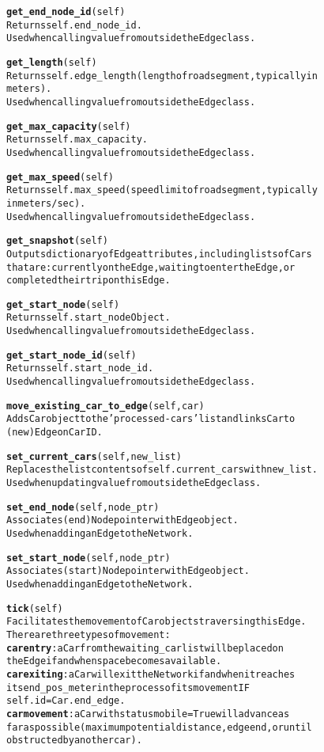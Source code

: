 \begin{alltt}
\textbf{get_end_node_id}(self)
Returns self.end_node_id.
Used when calling value from outside the Edge class.

\textbf{get_length}(self)
Returns self.edge_length (length of road segment, typically in 
meters).
Used when calling value from outside the Edge class.

\textbf{get_max_capacity}(self)
Returns self.max_capacity.
Used when calling value from outside the Edge class.

\textbf{get_max_speed}(self)
Returns self.max_speed (speed limit of road segment, typically
in meters/sec).
Used when calling value from outside the Edge class.

\textbf{get_snapshot}(self)
Outputs dictionary of Edge attributes, including lists of Cars 
that are:  currently on the Edge, waiting to enter the Edge, or 
completed their trip on this Edge.

\textbf{get_start_node}(self)
Returns self.start_node Object.
Used when calling value from outside the Edge class.

\textbf{get_start_node_id}(self)
Returns self.start_node_id.
Used when calling value from outside the Edge class.

\textbf{move_existing_car_to_edge}(self, car)
Adds Car object to the 'processed-cars' list and links Car to 
(new) Edge on Car ID.

\textbf{set_current_cars}(self, new_list)
Replaces the list contents of self.current_cars with new_list.
Used when updating value from outside the Edge class.

\textbf{set_end_node}(self, node_ptr)
Associates (end) Node pointer with Edge object.
Used when adding an Edge to the Network.

\textbf{set_start_node}(self, node_ptr)
Associates (start) Node pointer with Edge object.
Used when adding an Edge to the Network.

\textbf{tick}(self)
Facilitates the movement of Car objects traversing this Edge.  
There are three types of movement:
\textbf{car entry}:  a Car from the waiting_car list will be placed on 
the Edge if and when space becomes available.
\textbf{car exiting}:  a Car will exit the Network if and when it reaches
its end_pos_meter in the process of its movement IF 
self.id = Car.end_edge.
\textbf{car movement}:  a Car with status mobile = True will advance as
far as possible (maximum potential distance, edge end, or until 
obstructed by another car).

\end{alltt}



